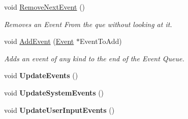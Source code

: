 \begin{DoxyCompactItemize}
void \hyperlink{classPhysEventManager_ad040054bd9018ff0fd27ad78ec1e87fa}{RemoveNextEvent} ()
\begin{DoxyCompactList}\small\item\em Removes an Event From the que without looking at it. \item\end{DoxyCompactList}\item 
void \hyperlink{classPhysEventManager_a6f51657b66d214942aed0e832ee558ef}{AddEvent} (\hyperlink{classphys_1_1Event}{Event} $\ast$EventToAdd)
\begin{DoxyCompactList}\small\item\em Adds an event of any kind to the end of the Event Queue. \item\end{DoxyCompactList}\item 
\hypertarget{classPhysEventManager_a34b4b8d35fee0f593fbb32b83843abba}{
void {\bfseries UpdateEvents} ()}
\label{d5/dd7/classPhysEventManager_a34b4b8d35fee0f593fbb32b83843abba}

\item 
\hypertarget{classPhysEventManager_adcdeb687464f00252e1c4052d4b9304e}{
void {\bfseries UpdateSystemEvents} ()}
\label{d5/dd7/classPhysEventManager_adcdeb687464f00252e1c4052d4b9304e}

\item 
\hypertarget{classPhysEventManager_a99f2350628caf751e156107d57646030}{
void {\bfseries UpdateUserInputEvents} ()}
\label{d5/dd7/classPhysEventManager_a99f2350628caf751e156107d57646030}


\end{DoxyCompactItemize}
